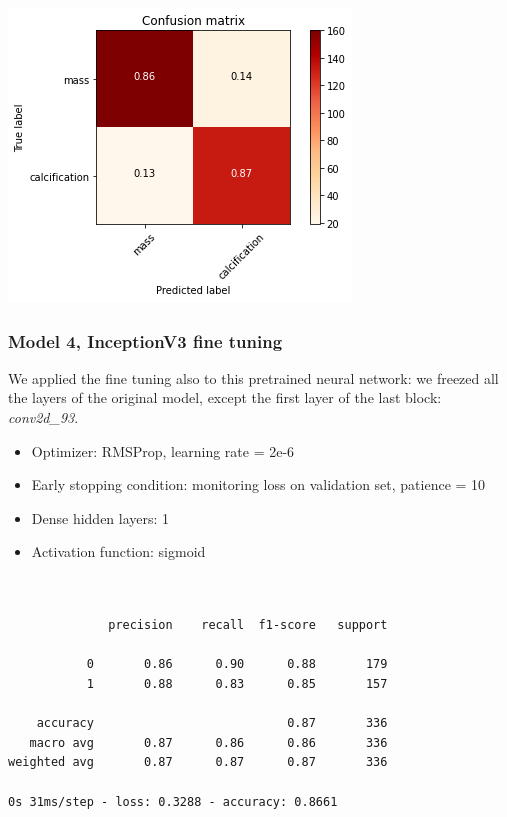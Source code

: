 \documentclass{article}
\begin{document}
\begin{center}
\begin{minipage}{0.45\textwidth}
        \includegraphics[scale=0.6]{./img/cmPreTrainInception_fe.png}
    \end{minipage}
\end{center}



\subsubsection{Model 4, InceptionV3 fine tuning}
We applied the fine tuning also to this pretrained neural network: we freezed all the layers of the original model, except the first layer of the last block: \textit{conv2d\_93}.

\begin{itemize}
\item Optimizer: RMSProp, learning rate = 2e-6
\item Early stopping condition: monitoring loss on validation set, patience = 10
\item Dense hidden layers: 1
\item Activation function: sigmoid
\end{itemize}

\begin{verbatim}


              precision    recall  f1-score   support

           0       0.86      0.90      0.88       179
           1       0.88      0.83      0.85       157

    accuracy                           0.87       336
   macro avg       0.87      0.86      0.86       336
weighted avg       0.87      0.87      0.87       336

0s 31ms/step - loss: 0.3288 - accuracy: 0.8661

\end{verbatim}
\end{document}
